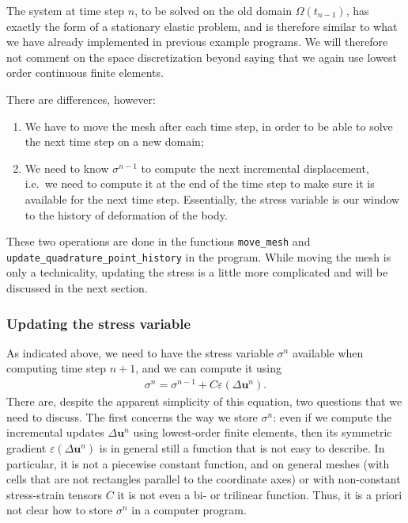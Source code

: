 \documentclass{article}
\renewcommand{\vec}[1]{\mathbf{#1}}
\begin{document}
The system at time step $n$, to be solved on the old domain
$\Omega(t_{n-1})$, has exactly the form of a stationary elastic
problem, and is therefore similar to what we have already implemented
in previous example programs. We will therefore not comment on the
space discretization beyond saying that we again use lowest order
continuous finite elements.

There are differences, however:
\begin{enumerate}
  \item We have to move the mesh after each time step, in order to be
  able to solve the next time step on a new domain;

  \item We need to know $\sigma^{n-1}$ to compute the next incremental
  displacement, i.e.~we need to compute it at the end of the time step
  to make sure it is available for the next time step. Essentially,
  the stress variable is our window to the history of deformation of
  the body.
\end{enumerate}
These two operations are done in the functions \texttt{move\_mesh} and
\texttt{update\_\-quadrature\_\-point\_history} in the program. While moving
the mesh is only a technicality, updating the stress is a little more
complicated and will be discussed in the next section.


\subsubsection*{Updating the stress variable}

As indicated above, we need to have the stress variable $\sigma^n$ available
when computing time step $n+1$, and we can compute it using
\begin{gather}
  \label{eq:stress-update}
  \sigma^n = \sigma^{n-1} + C \varepsilon (\Delta \vec u^n).  
\end{gather}
There are, despite the apparent simplicity of this equation, two questions
that we need to discuss. The first concerns the way we store $\sigma^n$: even
if we compute the incremental updates $\Delta\vec u^n$ using lowest-order
finite elements, then its symmetric gradient $\varepsilon(\Delta\vec u^n)$ is
in general still a function that is not easy to describe. In particular, it is
not a piecewise constant function, and on general meshes (with cells that are
not rectangles parallel to the coordinate axes) or with non-constant
stress-strain tensors $C$ it is not even a bi- or trilinear function. Thus, it
is a priori not clear how to store $\sigma^n$ in a computer program.
\end{document}
